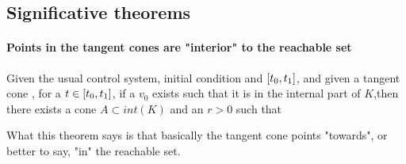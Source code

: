 %
%
\subsection{Significative theorems}
\paragraph[5.10]{Points in the tangent cones are "interior" to the reachable set}
\begin{teo}
	Given the usual control system, initial condition and $[t_0,t_1]$, and given a tangent cone , for a $t\in[t_0,t_1]$, if a $v_0$ exists such that it is in the internal part of $K$,then there exists a cone $A\subset int(K)$ and an $r>0$ such that 
\label{5-10}
\label{T7}
\end{teo}

What this theorem says is that basically the tangent cone points "towards", or better to say, "in" the reachable set. 

